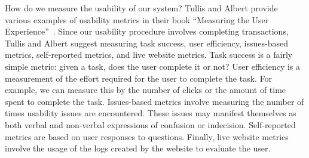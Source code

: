 How do we measure the usability of our system? Tullis and Albert provide various examples of usability metrics in their book ``Measuring the User Experience''~\cite{tullis-measuring-ux}. Since our usability procedure involves completing transactions, Tullis and Albert suggest measuring task success, user efficiency, issues-based metrics, self-reported metrics, and live website metrics. Task success is a fairly simple metric: given a task, does the user complete it or not? User efficiency is a measurement of the effort required for the user to complete the task. For example, we can measure this by the number of clicks or the amount of time spent to complete the task. Issues-based metrics involve measuring the number of times usability issues are encountered. These issues may manifest themselves as both verbal and non-verbal expressions of confusion or indecision. Self-reported metrics are based on user responses to questions. Finally, live website metrics involve the usage of the logs created by the website to evaluate the user.

% 
